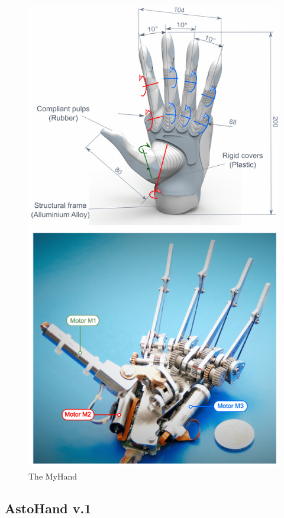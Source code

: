 \documentclass[a4paper, 10pt, conference]{ieeeconf}      %
\begin{document}
\begin{figure}[h]

	\centering
	\includegraphics[scale=0.15]{images/MyHand}
	
	\caption{The MyHand}
\end{figure}


\subsection{AstoHand v.1}
\end{document}
